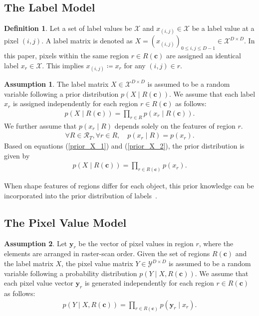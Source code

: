 \documentclass[conference]{IEEEtran}
\theoremstyle{definition}
\newtheorem{defi}{Definition}
\newtheorem{assumption}{Assumption}
\begin{document}
\subsection{The Label Model}

\begin{defi}
  Let a set of label values be $\mathcal{X}$ and $x_{(i,j)} \in \mathcal{X}$ be a label value at a pixel $(i,j)$. 
  A label matrix is denoted as $X=(x_{(i,j)})_{0\leq i,j \leq D-1} \in \mathcal{X}^{D \times D}$.
  In this paper, pixels within the same region $r \in R(\bm{c})$ are assigned an identical label $x_r \in \mathcal{X}$. 
  This implies $x_{(i,j)} \coloneqq x_r$ for any $(i,j) \in r$.
\end{defi}

\begin{assumption}
  The label matrix $X\in\mathcal{X}^{D \times D}$ is assumed to be a random variable following a prior distribution $p(X \mid R(\bm{c}))$. 
  We assume that each label $x_r$ is assigned independently for each region $r \in R(\bm{c})$ as follows:
  \begin{align}
    p(X \mid R(\bm{c})) = \prod_{r \in R} p(x_r \mid R(\bm{c})). \label{prior_X_1}
  \end{align}
  We further assume that $p(x_r \mid R)$ depends solely on the features of region $r$. 
  \begin{align}
    \forall R \in \mathcal{R}_T, \forall r \in R, \quad p(x_r \mid R) = p(x_r). \label{prior_X_2}
  \end{align}
  Based on equations (\ref{prior_X_1}) and (\ref{prior_X_2}), the prior distribution is given by
  \begin{align}
    p(X \mid R(\bm{c})) = \prod_{r \in R(\bm{c})} p(x_r).
  \end{align}
\end{assumption}

When shape features of regions differ for each object, this prior knowledge can be incorporated into the prior distribution of labels~\cite{Dryden_ShapePrior, Gould_CRF}.


\subsection{The Pixel Value Model}


\begin{assumption}
Let $\bm{y}_r$ be the vector of pixel values in region $r$, where the elements are arranged in raster-scan order. Given the set of regions $R(\bm{c})$ and the label matrix $X$, the pixel value matrix $Y\in\mathcal{Y}^{D\times D}$ is assumed to be a random variable following a probability distribution $p(Y\mid X, R(\bm{c}))$. We assume that each pixel value vector $\bm{y}_r$ is generated independently for each region $r\in R(\bm{c})$ as follows:
\begin{align}
  p\left(Y \mid X, R(\bm{c})\right) = \prod_{r \in R(\bm{c})} p(\bm{y}_r \mid x_r).
\end{align}
\end{assumption}
\end{document}
